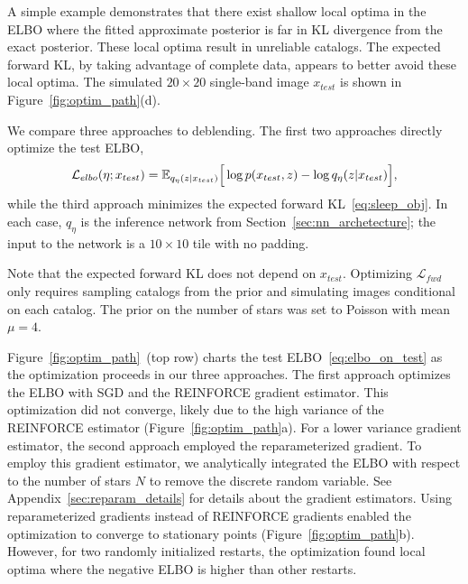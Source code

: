 

\label{sec:elbo_sleep_compare}

A simple example demonstrates that there exist shallow local optima in the ELBO
where the fitted approximate posterior is far in KL divergence from the exact posterior.
These local optima result in unreliable catalogs.
The expected forward KL, by taking advantage of complete data, appears to better avoid these local optima.
The simulated $20\times20$ single-band image $x_{test}$ is shown in Figure~\ref{fig:optim_path}(d).

We compare three approaches to deblending. The first two approaches directly optimize the test ELBO,
\begin{align}
\mathcal{L}_{elbo}(\eta; x_{test}) = \mathbb{E}_{q_{\eta}(z | x_{test})}\Big[\log p(x_{test}, z) - \log q_{\eta}(z | x_{test})\Big],
\label{eq:elbo_on_test}
\end{align}
while the third approach minimizes the expected forward KL~\eqref{eq:sleep_obj}.
In each case, $q_\eta$ is the inference network from Section~\ref{sec:nn_archetecture};
the input to the network is a $10\times 10$ tile with no padding.

Note that the expected forward KL does not depend on $x_{test}$.
Optimizing $\mathcal{L}_{fwd}$ only requires sampling catalogs from the prior
and simulating images conditional on each catalog.
The prior on the number of stars was set to Poisson with mean $\mu = 4$.

Figure~\ref{fig:optim_path}~(top row) charts the test ELBO~\eqref{eq:elbo_on_test}
as the optimization proceeds in our three approaches.
The first approach optimizes the ELBO with SGD and the REINFORCE gradient estimator.
This optimization did not converge, likely due to the high variance of the REINFORCE estimator (Figure~\ref{fig:optim_path}a).
For a lower variance gradient estimator, the second approach employed the reparameterized gradient. To employ this gradient estimator, we analytically integrated the ELBO with respect to the number of stars $N$ to remove the discrete random variable.
See Appendix~\ref{sec:reparam_details} for details about the gradient estimators.
Using reparameterized gradients instead of REINFORCE gradients enabled the optimization to converge to stationary points (Figure~\ref{fig:optim_path}b).
However, for two randomly initialized restarts,
the optimization found local optima where the negative ELBO is higher than other restarts.

